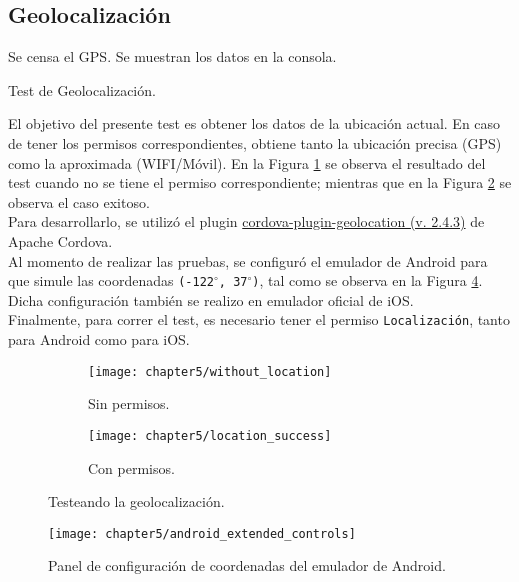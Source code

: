 \subsection{Geolocalización}
\begin{algorithm}
	\begin{algorithmic}[1]
		\STATE Se censa el GPS.
		\STATE Se muestran los datos en la consola.
	\end{algorithmic}
	\caption{Test de Geolocalización.}\label{alg:chap5:test_geolocalizacion}
\end{algorithm}
El objetivo del presente test es obtener los datos de la ubicación actual. En caso de tener los permisos correspondientes, obtiene tanto la ubicación precisa (GPS) como la aproximada (WIFI/Móvil). En la Figura \ref{fig:ch05:without_location} se observa el resultado del test cuando no se tiene el permiso correspondiente; mientras que en la Figura \ref{fig:ch05:with_location} se observa el caso exitoso.\\
Para desarrollarlo, se utilizó el plugin \href{https://github.com/apache/cordova-plugin-geolocation}{cordova-plugin-geolocation (v. 2.4.3)} de Apache Cordova.\\
Al momento de realizar las pruebas, se configuró el emulador de Android para que simule las coordenadas \texttt{(-122$^\circ$, 37$^\circ$)}, tal como se observa en la Figura \ref{fig:ch05:android_extended_controls}. Dicha configuración también se realizo en emulador oficial de iOS.\\
Finalmente, para correr el test, es necesario tener el permiso \texttt{Localización}, tanto para Android como para iOS.
\begin{figure}[htbp]
    \centering
	\begin{subfigure}{0.3\linewidth}
		\texttt{[image: chapter5/without\_location]}
		\caption{Sin permisos.}
		\label{fig:ch05:without_location}
	\end{subfigure}
	\begin{subfigure}{0.3\linewidth}
		\texttt{[image: chapter5/location\_success]}
		\caption{Con permisos.}
		\label{fig:ch05:with_location}
	\end{subfigure}
	\caption{Testeando la geolocalización.}
	\label{fig:ch05:geolocation-cases}
\end{figure}
\begin{figure}[hbtp]
    \centering
	\texttt{[image: chapter5/android\_extended\_controls]}
	\caption{Panel de configuración de coordenadas del emulador de Android.}
	\label{fig:ch05:android_extended_controls}
\end{figure}
\newpage
